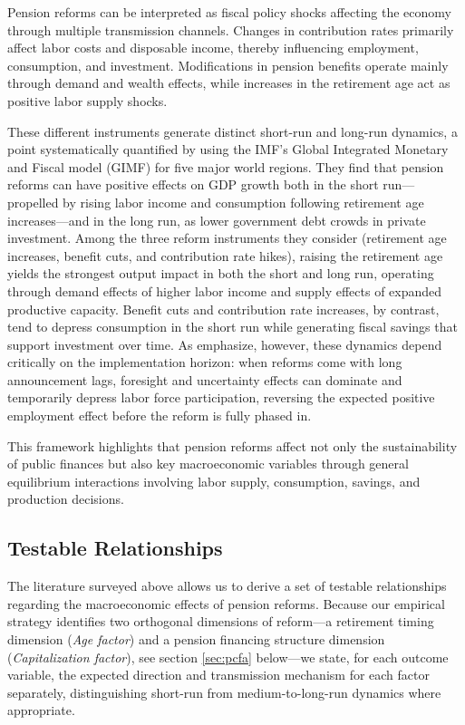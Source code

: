 \documentclass[11pt,english,a4paper, twoside, authoryear]{article}
\begin{document}
Pension reforms can be interpreted as fiscal policy shocks affecting the economy through multiple transmission channels. Changes in contribution rates primarily affect labor costs and disposable income, thereby influencing employment, consumption, and investment. Modifications in pension benefits operate mainly through demand and wealth effects, while increases in the retirement age act as positive labor supply shocks.

These different instruments generate distinct short-run and long-run dynamics, a point systematically quantified by \citet{KaramMuirPereiraTuladhar2010} using the IMF's Global Integrated Monetary and Fiscal model (GIMF) for five major world regions. They find that pension reforms can have positive effects on GDP growth both in the short run---propelled by rising labor income and consumption following retirement age increases---and in the long run, as lower government debt crowds in private investment. Among the three reform instruments they consider (retirement age increases, benefit cuts, and contribution rate hikes), raising the retirement age yields the strongest output impact in both the short and long run, operating through demand effects of higher labor income and supply effects of expanded productive capacity. Benefit cuts and contribution rate increases, by contrast, tend to depress consumption in the short run while generating fiscal savings that support investment over time. As \citet{BiZubairy2023} emphasize, however, these dynamics depend critically on the implementation horizon: when reforms come with long announcement lags, foresight and uncertainty effects can dominate and temporarily depress labor force participation, reversing the expected positive employment effect before the reform is fully phased in.

This framework highlights that pension reforms affect not only the sustainability of public finances but also key macroeconomic variables through general equilibrium interactions involving labor supply, consumption, savings, and production decisions.

\subsection{Testable Relationships}\label{sec:TR}

The literature surveyed above allows us to derive a set of testable relationships regarding the macroeconomic effects of pension reforms. Because our empirical strategy identifies two orthogonal dimensions of reform---a retirement timing dimension (\textit{Age factor}) and a pension financing structure dimension (\textit{Capitalization factor}), see section \ref{sec:pcfa} below---we state, for each outcome variable, the expected direction and transmission mechanism for each factor separately, distinguishing short-run from medium-to-long-run dynamics where appropriate.
\end{document}
